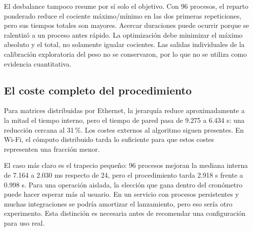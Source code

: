 El desbalance tampoco resume por sí solo el objetivo. Con 96 procesos, el reparto ponderado reduce el cociente máximo/mínimo en las dos primeras repeticiones, pero sus tiempos totales son mayores. Acercar duraciones puede ocurrir porque se ralentizó a un proceso antes rápido. La optimización debe minimizar el máximo absoluto y el total, no solamente igualar cocientes. Las salidas individuales de la calibración exploratoria del peso no se conservaron, por lo que no se utiliza como evidencia cuantitativa.

\subsection{El coste completo del procedimiento}

\begin{table}[H]\caption{Medianas del tiempo interno y del procedimiento de prueba. $\Delta$ es la mediana de las diferencias por corrida; no necesariamente equivale a restar las dos columnas de medianas.}\label{tab:pared}

\end{table}

Para matrices distribuidas por Ethernet, la jerarquía reduce aproximadamente a la mitad el tiempo interno, pero el tiempo de pared pasa de 9.275 a 6.434 s: una reducción cercana al 31\,\%. Los costes externos al algoritmo siguen presentes. En Wi-Fi, el cómputo distribuido tarda lo suficiente para que estos costes representen una fracción menor.

El caso más claro es el trapecio pequeño: 96 procesos mejoran la mediana interna de 7.164 a 2.030 ms respecto de 24, pero el procedimiento tarda 2.918 s frente a 0.998 s. Para una operación aislada, la elección que gana dentro del cronómetro puede hacer esperar más al usuario. En un servicio con procesos persistentes y muchas integraciones se podría amortizar el lanzamiento, pero eso sería otro experimento. Esta distinción es necesaria antes de recomendar una configuración para uso real.
